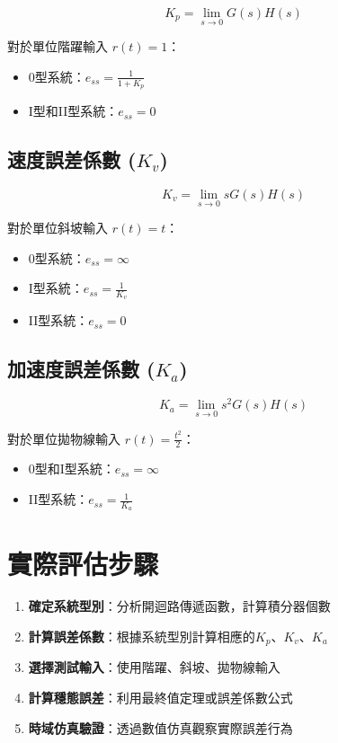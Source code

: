 \documentclass{article}
\begin{document}
\begin{equation}
K_p = \lim_{s \to 0} G(s)H(s)
\end{equation}

對於單位階躍輸入 $r(t) = 1$：
\begin{itemize}
    \item 0型系統：$e_{ss} = \frac{1}{1+K_p}$
    \item I型和II型系統：$e_{ss} = 0$
\end{itemize}

\subsection{速度誤差係數 ($K_v$)}

\begin{equation}
K_v = \lim_{s \to 0} sG(s)H(s)
\end{equation}

對於單位斜坡輸入 $r(t) = t$：
\begin{itemize}
    \item 0型系統：$e_{ss} = \infty$
    \item I型系統：$e_{ss} = \frac{1}{K_v}$
    \item II型系統：$e_{ss} = 0$
\end{itemize}

\subsection{加速度誤差係數 ($K_a$)}

\begin{equation}
K_a = \lim_{s \to 0} s^2G(s)H(s)
\end{equation}

對於單位拋物線輸入 $r(t) = \frac{t^2}{2}$：
\begin{itemize}
    \item 0型和I型系統：$e_{ss} = \infty$
    \item II型系統：$e_{ss} = \frac{1}{K_a}$
\end{itemize}

\section{實際評估步驟}

\begin{enumerate}
    \item \textbf{確定系統型別}：分析開迴路傳遞函數，計算積分器個數
    \item \textbf{計算誤差係數}：根據系統型別計算相應的$K_p$、$K_v$、$K_a$
    \item \textbf{選擇測試輸入}：使用階躍、斜坡、拋物線輸入
    \item \textbf{計算穩態誤差}：利用最終值定理或誤差係數公式
    \item \textbf{時域仿真驗證}：透過數值仿真觀察實際誤差行為
\end{enumerate}
\end{document}
